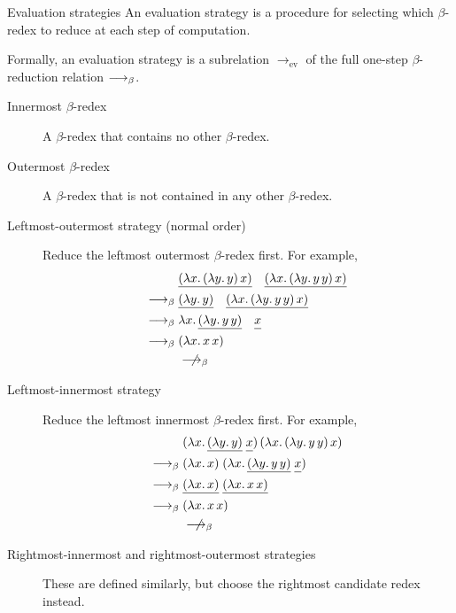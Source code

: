 \begin{frame}[allowframebreaks]{Evaluation strategies}
  An evaluation strategy is a procedure for selecting which $\beta$-redex to
reduce at each step of computation.

  \vfill

  Formally, an evaluation strategy is a subrelation
  $\longrightarrow_{\mathrm{ev}}$ of the full one-step $\beta$-reduction
  relation $\longrightarrow_{\beta}$.

  \begin{description}
    \item[Innermost $\beta$-redex] A $\beta$-redex that contains no other
      $\beta$-redex.
    \item[Outermost $\beta$-redex] A $\beta$-redex that is not contained in any
      other $\beta$-redex.
  \end{description}

  \begin{description}
    \item[Leftmost-outermost strategy (normal order)]
      Reduce the leftmost outermost $\beta$-redex first. For example,
      \begin{align*}
        &
        \underline{(\lambda x.\,(\lambda y.\,y)\,x)}\quad
        \underline{(\lambda x.\,(\lambda y.\,y\,y)\,x)} \\
        \onereduce{}
        &\underline{(\lambda y.\,y)}\quad
        \underline{(\lambda x.\,(\lambda y.\,y\,y)\,x)} \\
        \onereduce{}
        &\lambda x.\,\underline{(\lambda y.\,y\,y)}\quad
        \underline{\vphantom{(\lambda}x} \\
        \onereduce{}
        &(\lambda x.\,x\,x) \\
        &\notonereduce
      \end{align*}

    \item[Leftmost-innermost strategy]
      Reduce the leftmost innermost $\beta$-redex first. For example,
      \begin{align*}
        &(\lambda x.\,\underline{(\lambda y.\,y)}\;
          \underline{\vphantom{(\lambda}x})\,
          (\lambda x.\,(\lambda y.\,y\,y)\,x) \\
        \onereduce{}
        &(\lambda x.\,x)\;
          (\lambda x.\,\underline{(\lambda y.\,y\,y)}\;
          \underline{\vphantom{(\lambda}x}) \\
        \onereduce{}
        &\underline{(\lambda x.\,x)}\;
          \underline{(\lambda x.\,x\,x)} \\
        \onereduce{}
        &(\lambda x.\,x\,x) \\
        &\notonereduce
      \end{align*}

    \item[Rightmost-innermost and rightmost-outermost strategies]
      These are defined similarly, but choose the rightmost candidate redex
      instead.
  \end{description}
\end{frame}

